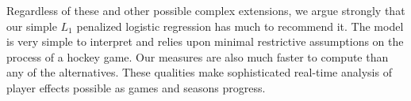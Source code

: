 Regardless of these and other possible complex extensions, we argue strongly
that our simple $L_1$ penalized logistic regression has much to recommend it.
The model is very simple to interpret and relies upon minimal restrictive
assumptions on the process of a hockey game.    Our measures are also much
faster to compute than any of the alternatives. These qualities make
sophisticated real-time analysis of player effects possible as games and
seasons progress.


